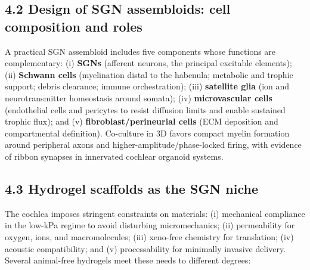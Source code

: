 \subsection*{4.2 Design of SGN assembloids: cell composition and roles}
A practical SGN assembloid includes five components whose functions are complementary: (i) \textbf{SGNs} (afferent neurons, the principal excitable elements); (ii) \textbf{Schwann cells} (myelination distal to the habenula; metabolic and trophic support; debris clearance; immune orchestration);\citep{Oliveira2023FrontiersPN,Moss2024iScience} (iii) \textbf{satellite glia} (ion and neurotransmitter homeostasis around somata); (iv) \textbf{microvascular cells} (endothelial cells and pericytes to resist diffusion limits and enable sustained trophic flux); and (v) \textbf{fibroblast/perineurial cells} (ECM deposition and compartmental definition). Co-culture in 3D favors compact myelin formation around peripheral axons and higher-amplitude/phase-locked firing, with evidence of ribbon synapses in innervated cochlear organoid systems.\citep{Xia2023StemCellReports}

\subsection*{4.3 Hydrogel scaffolds as the SGN niche}
The cochlea imposes stringent constraints on materials: (i) mechanical compliance in the low-kPa regime to avoid disturbing micromechanics; (ii) permeability for oxygen, ions, and macromolecules; (iii) xeno-free chemistry for translation; (iv) acoustic compatibility; and (v) processability for minimally invasive delivery. Several animal-free hydrogels meet these needs to different degrees:

